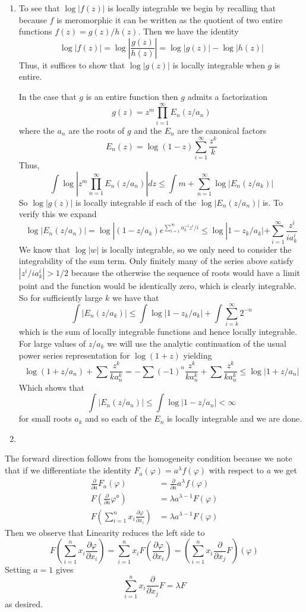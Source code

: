 \documentclass{article}
\newcommand{\exercise}[1]{\noindent{\textbf{Exercise #1:}}}
\newcommand{\der}[2]{\frac{\partial #1}{\partial #2}}
\begin{document}
\exercise{3.4.17}
\begin{enumerate}
\item To see that $\log |f(z)|$ is locally integrable we begin by
  recalling that because $f$ is meromorphic it can be written as the
  quotient of two entire functions $f(z) = g(z)/h(z)$. Then we have
  the identity
  \[
  \log |f(z)| = \log \left|\frac{g(z)}{h(z)}\right| = \log |g(z)| - \log |h(z)|
  \]
  Thus, it suffices to show that $\log |g(z)|$ is locally integrable
  when $g$ is entire.

  In the case that $g$ is an entire function then $g$ admits a
  factorization
  \[
  g(z) = z^m\prod_{i=1}^\infty E_n(z/a_n)
  \]
  where the $a_n$ are the roots of $g$ and the $E_n$ are the canonical factors
  \[
  E_n(z) = \log (1-z)\sum_{i=1}^\infty \frac{z^k}{k}
  \]
  Thus,
  \[
  \int \log \left|z^m\prod_{n=1}^\infty E_n(z/a_n)\right|dz \leq \int
  m + \sum_{n=1}^\infty \log |E_n(z/a_k)|
  \]
  So $\log|g(z)|$ is locally integrable if each of the $\log
  |E_n(z/a_n)|$ is. To verify this we expand
  \[
  \log |E_n(z/a_n)| = \log|
  (1-z/a_k)e^{\sum_{i=1}^\infty a_k^{-i}z^i/i} \leq \log |1-z_k/a_k| +
\sum_{i=1}^\infty \frac{z^i}{ia_k^i}
  \]
  We know that $\log |w|$ is locally integrable, so we only need to
  consider the integrability of the sum term. Only finitely many of
  the series above satisfy $|z^i/ia_k^i| > 1/2$ because the otherwise
  the sequence of roots would have a limit point and the function
  would be identically zero, which is clearly integrable. So for
  sufficiently large $k$ we have that
  \[
  \int |E_n(z/a_k)| \leq \int \log |1-z_k/a_k| + \int \sum_{i=k}^\infty 2^{-n}
  \]
  which is the sum of locally integrable functions and hence locally
  integrable. For large values of $z/a_k$ we will use the analytic
  continuation of the usual power series representation for $\log
  (1+z)$ yielding
  \[
  \log (1+z/a_n) + \sum \frac{z^k}{ka_n^k} = -\sum
  (-1)^n\frac{z^k}{ka_n^k} + \sum \frac{z^k}{ka_n^k} \leq \log |1+z/a_n|
  \]
  Which shows that
  \[
  \int |E_n(z/a_n)| \leq \int \log |1-z/a_n| < \infty
  \]
  for small roots $a_k$ and so each of the $E_n$ is locally integrable
  and we are done.
\item 
\end{enumerate}

\exercise{3.4.18}

The forward direction follows from the homogeneity condition because
we note that if we differentiate the identity $F_a(\varphi) =
a^\lambda f(\varphi)$ with respect to $a$ we get
\begin{align*}
  \der{}{a} F_a(\varphi) &= \der{}{a} a^\lambda f(\varphi) \\
  F(\der{}{a} \varphi^a) &= \lambda a^{\lambda -1}F(\varphi) \\
  F\left(\sum_{i=1}^n x_i \der{\varphi}{x_i}\right) &= \lambda a^{\lambda
      -1}F(\varphi)
\end{align*}
Then we observe that Linearity reduces the left side to
\[
F\left(\sum_{i=1}^n x_i \der{\varphi}{x_i}\right) = \sum_{i=1}^n x_i
F\left(\der{\varphi}{x_i}\right) = \left(\sum_{i=1}^n x_i
  \der{}{x_j}F\right)(\varphi)
\]
Setting $a = 1$ gives
\[
\sum_{i=1}^n x_i \der{}{x_j}F = \lambda F
\]
as desired.
\end{document}

